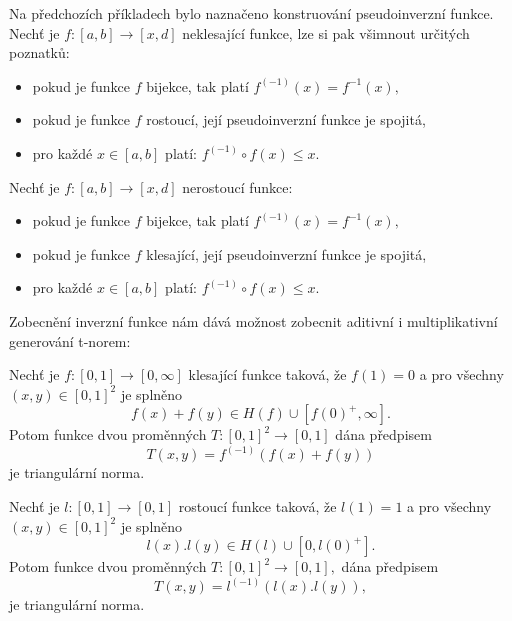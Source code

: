 \begin{remark} Na předchozích příkladech bylo naznačeno konstruování pseudoinverzní funkce. Nech\v t je $f:[a,b] \rightarrow [x,d]$ neklesající funkce, lze si pak všimnout určitých poznatk\r u:
    \begin{itemize}
        \item pokud je funkce $f$ bijekce, tak platí $f^{(-1)}(x) = f^{-1}(x),$
        \item  pokud je funkce $f$ rostoucí, její pseudoinverzní funkce je spojitá,
        \item  pro každé $x \in [a,b]$ platí: $f^{(-1)}\circ f(x)\leq x.$
    \end{itemize}
    Nech\v t je $f:[a,b] \rightarrow [x,d]$ nerostoucí funkce:
    \begin{itemize}
        \item pokud je funkce $f$ bijekce, tak platí $f^{(-1)}(x) = f^{-1}(x),$
        \item  pokud je funkce $f$ klesající, její pseudoinverzní funkce je spojitá,
        \item  pro každé $x \in [a,b]$ platí: $f^{(-1)}\circ f(x)\leq x.$
    \end{itemize}
\end{remark}

 Zobecn\v en\'i inverzn\'i funkce n\'am d\'av\'a mo\v znost zobecnit aditivn\'i i multiplikativn\'i generov\'an\'i t-norem:
\begin{sentence} \cite{KMP}
    Nech\v t je $f:[0,1] \rightarrow [0,\infty]$ klesající funkce
    taková, že $f(1)=0$ a pro všechny $(x,y) \in [0,1]^2$  je splněno
    $$f(x)+f(y) \in H(f) \cup [f(0)^+,\infty].$$
    Potom funkce dvou proměnných $T:[0,1]^2 \rightarrow [0,1]$ dána předpisem
    $$T(x,y)=f^{(-1)}(f(x)+f(y))$$
    je triangulární norma.
\end{sentence}
\begin{sentence}\cite{KMP}
    Nech\v t je $l:[0,1] \rightarrow [0,1]$ rostoucí funkce
    taková, že $l(1)=1$ a pro všechny $(x,y) \in [0,1]^2$  je splněno
    $$l(x).l(y) \in H(l) \cup [0,l(0)^+].$$
    Potom funkce dvou proměnných $T:[0,1]^2 \rightarrow [0,1],$ dána předpisem
    $$T(x,y)=l^{(-1)}(l(x).l(y)),$$
    je triangulární norma.
\end{sentence}


